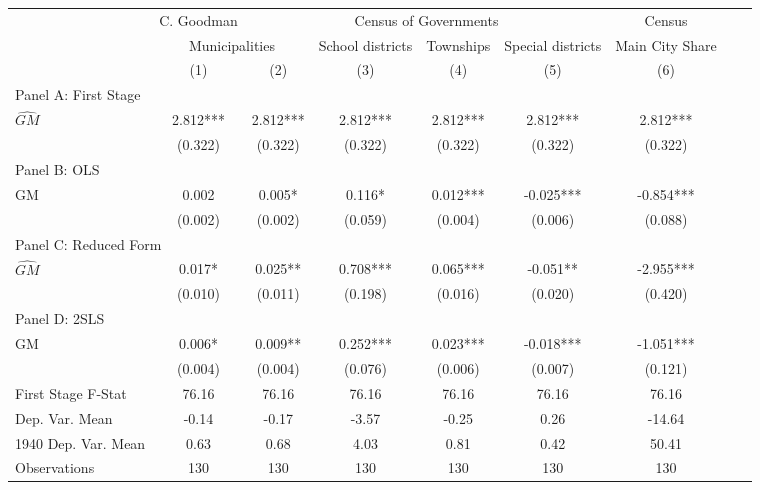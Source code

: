  \begin{tabular}{l*{8}{c}} \toprule
&\multicolumn{1}{c}{C. Goodman}&\multicolumn{4}{c}{Census of Governments}&\multicolumn{1}{c}{Census}\\\cmidrule(lr){2-2}\cmidrule(lr){3-6}\cmidrule(lr){7-7}
&\multicolumn{2}{c}{Municipalities}&\multicolumn{1}{c}{School districts}&\multicolumn{1}{c}{Townships}&\multicolumn{1}{c}{Special districts}&\multicolumn{1}{c}{Main City Share}\\\cmidrule(lr){2-3}\cmidrule(lr){4-6}\cmidrule(lr){7-7}
&\multicolumn{1}{c}{(1)}&\multicolumn{1}{c}{(2)}&\multicolumn{1}{c}{(3)}&\multicolumn{1}{c}{(4)}&\multicolumn{1}{c}{(5)}&\multicolumn{1}{c}{(6)}\\
\cmidrule(lr){1-7}
\multicolumn{6}{l}{Panel A: First Stage}\\
\cmidrule(lr){1-7}
$\widehat{GM}$  &    2.812***&    2.812***&    2.812***&    2.812***&    2.812***&    2.812***\\
                &  (0.322)   &  (0.322)   &  (0.322)   &  (0.322)   &  (0.322)   &  (0.322)   \\
\cmidrule(lr){1-7}
\multicolumn{6}{l}{Panel B: OLS}\\
\cmidrule(lr){1-7}
GM              &    0.002   &    0.005*  &    0.116*  &    0.012***&   -0.025***&   -0.854***\\
                &  (0.002)   &  (0.002)   &  (0.059)   &  (0.004)   &  (0.006)   &  (0.088)   \\
\cmidrule(lr){1-7}
\multicolumn{6}{l}{Panel C: Reduced Form}\\
\cmidrule(lr){1-7}
$\widehat{GM}$  &    0.017*  &    0.025** &    0.708***&    0.065***&   -0.051** &   -2.955***\\
                &  (0.010)   &  (0.011)   &  (0.198)   &  (0.016)   &  (0.020)   &  (0.420)   \\
\cmidrule(lr){1-7}
\multicolumn{6}{l}{Panel D: 2SLS}\\
\cmidrule(lr){1-7}
GM              &    0.006*  &    0.009** &    0.252***&    0.023***&   -0.018***&   -1.051***\\
                &  (0.004)   &  (0.004)   &  (0.076)   &  (0.006)   &  (0.007)   &  (0.121)   \\
\midrule
First Stage F-Stat&    76.16   &    76.16   &    76.16   &    76.16   &    76.16   &    76.16   \\
Dep. Var. Mean  &    -0.14   &    -0.17   &    -3.57   &    -0.25   &     0.26   &   -14.64   \\
1940 Dep. Var. Mean&     0.63   &     0.68   &     4.03   &     0.81   &     0.42   &    50.41   \\
Observations    &      130   &      130   &      130   &      130   &      130   &      130   \\
       \bottomrule \end{tabular}
